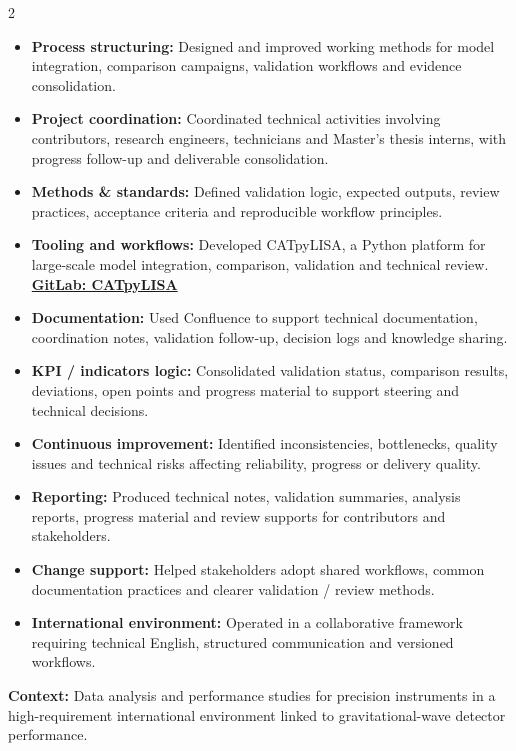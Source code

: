 \documentclass[8pt,a4paper,ragged2e,withhyper]{altacv}
\begin{document}
\begin{paracol}{2}
\begin{itemize}
  \item \textbf{Process structuring:} Designed and improved working methods for model integration, comparison campaigns, validation workflows and evidence consolidation.
  \item \textbf{Project coordination:} Coordinated technical activities involving contributors, research engineers, technicians and Master's thesis interns, with progress follow-up and deliverable consolidation.
  \item \textbf{Methods \& standards:} Defined validation logic, expected outputs, review practices, acceptance criteria and reproducible workflow principles.
  \item \textbf{Tooling and workflows:} Developed CATpyLISA, a Python platform for large-scale model integration, comparison, validation and technical review.
  \textcolor{DarkPastelRed}{\href{https://gitlab.oca.eu/gboileau/lisa_l3_tools}{\bf GitLab: CATpyLISA}}
  \item \textbf{Documentation:} Used Confluence to support technical documentation, coordination notes, validation follow-up, decision logs and knowledge sharing.
  \item \textbf{KPI / indicators logic:} Consolidated validation status, comparison results, deviations, open points and progress material to support steering and technical decisions.
  \item \textbf{Continuous improvement:} Identified inconsistencies, bottlenecks, quality issues and technical risks affecting reliability, progress or delivery quality.
  \item \textbf{Reporting:} Produced technical notes, validation summaries, analysis reports, progress material and review supports for contributors and stakeholders.
  \item \textbf{Change support:} Helped stakeholders adopt shared workflows, common documentation practices and clearer validation / review methods.
  \item \textbf{International environment:} Operated in a collaborative framework requiring technical English, structured communication and versioned workflows.
\end{itemize}

\divider


\textbf{Context:} Data analysis and performance studies for precision instruments in a high-requirement international environment linked to gravitational-wave detector performance.


\end{paracol}
\end{document}
